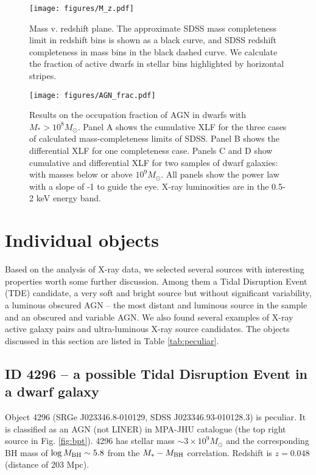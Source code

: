\documentclass[fleqn,usenatbib]{mnras}
\newcommand{\msun}{M_\odot}
\begin{document}
\begin{figure}
    \texttt{[image: figures/M\_z.pdf]}
    \caption[Dwarf galaxies stellar mass - redshift plane.]{Mass v. redshift plane. The approximate SDSS mass completeness limit in redshift bins is shown as a black curve, and SDSS redshift completeness in mass bins in the black dashed curve. We calculate the fraction of active dwarfs in stellar bins highlighted by horizontal stripes.}
    \label{fig:M_z}
\end{figure}

\begin{figure*}
    \texttt{[image: figures/AGN\_frac.pdf]}
    \caption[Dwarf galaxies differential and cumulative occupation fraction obtained with eROSITA.]{Results on the occupation fraction of AGN in dwarfs with $M_*>10^8 \msun$. Panel A shows the cumulative XLF for the three cases of calculated mass-completeness limits of SDSS. Panel B shows the differential XLF for one completeness case. Panels C and D show cumulative and differential XLF for two samples of dwarf galaxies: with masses below or above $10^9 \msun$. All panels show the power law with a slope of -1 to guide the eye. X-ray luminosities are in the 0.5-2 keV energy band.}
    \label{fig:agn_frac}
\end{figure*}


\section{Individual objects}
\label{sect:indiv}

Based on the analysis of X-ray data, we selected  several sources with interesting properties worth some further discussion. Among them  a Tidal Disruption Event (TDE) candidate, a very soft and bright source but without significant variability, a luminous obscured AGN -- the most distant and luminous source in the sample and  an obscured and variable AGN. We also found several examples of X-ray active galaxy pairs and ultra-luminous X-ray source candidates.  The objects discussed in this section are listed in  Table \ref{tab:peculiar}.


\subsection{ID 4296 -- a possible Tidal Disruption Event in a dwarf galaxy}
\label{sect:indiv:tde}
Object 4296 (SRGe J023346.8-010129, SDSS J023346.93-010128.3) is peculiar. It is classified as an AGN (not LINER) in MPA-JHU catalogue (the top right source in Fig. \ref{fig:bpt}).  4296 has stellar mass $\sim3\times10^9 \msun$ and the corresponding BH mass of $\log M_{\rm BH}\sim5.8$ from the $M_*-M_{\rm BH}$ correlation. Redshift is $z = 0.048$ (distance of 203 Mpc). 
\end{document}
